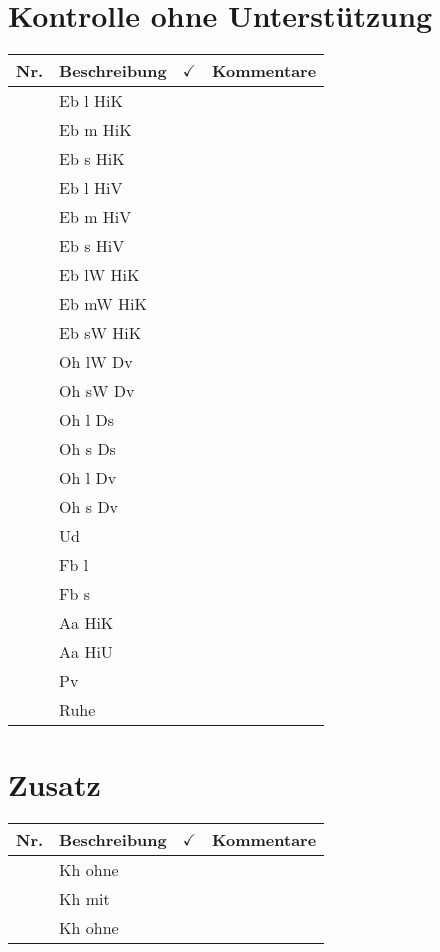 \documentclass{article}
\newcommand{\incRun}{ \addtocounter{run}{1} }
\newcommand{\nRun}{\incRun \arabic{run}}
\begin{document}
\section{Kontrolle ohne Unterst\"utzung}
\begin{center}
  \begin{tabular}{ >{\raggedleft} p{} | p{} |p{} |p{}}
    \textbf{Nr.}  & \textbf{Beschreibung} & $\checkmark$ & \textbf{Kommentare}\\ \hline
\nRun & Eb l HiK & &\\  \hline
\nRun & Eb m HiK & &\\  \hline
\nRun & Eb s HiK & &\\  \hline
\nRun & Eb l HiV & &\\  \hline
\nRun & Eb m HiV & &\\  \hline
\nRun & Eb s HiV & &\\  \hline
\nRun & Eb lW HiK & &\\  \hline
\nRun & Eb mW HiK & &\\  \hline
\nRun & Eb sW HiK & &\\  \hline
\nRun & Oh lW Dv & &\\  \hline
\nRun & Oh sW Dv & &\\  \hline
\nRun & Oh l Ds & &\\  \hline
\nRun & Oh s Ds & &\\  \hline
\nRun & Oh l Dv & &\\  \hline
\nRun & Oh s Dv & &\\  \hline
\nRun & Ud & &\\  \hline
\nRun & Fb l & &\\  \hline
\nRun & Fb s & &\\  \hline
\nRun & Aa HiK & &\\  \hline
\nRun & Aa HiU & &\\  \hline
\nRun & Pv & &\\  \hline
\nRun & Ruhe & & \\
  \end{tabular}
\end{center}

\section{Zusatz}
\begin{center}
  \begin{tabular}{ >{\raggedleft} p{} | p{} |p{} |p{}}
    \textbf{Nr.}  & \textbf{Beschreibung} & $\checkmark$ & \textbf{Kommentare}\\ \hline
\nRun & Kh ohne & &\\  \hline
\nRun & Kh mit & &\\  \hline
\nRun & Kh ohne & &\\ 
  \end{tabular}
\end{center}
\end{document}
